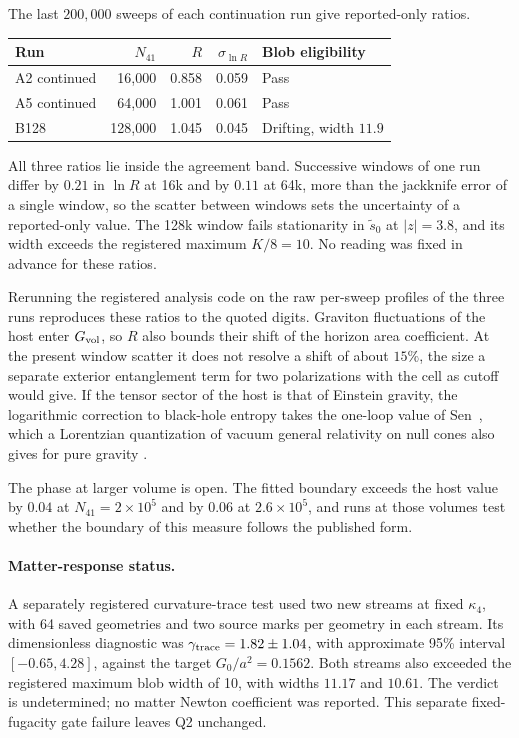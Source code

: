 The last $200{,}000$ sweeps of each continuation run give reported-only
ratios.

\begin{center}
\small
\begin{tabular}{lrrrl}
\hline
Run & $N_{41}$ & $R$ & $\sigma_{\ln R}$ & Blob eligibility\\
\hline
A2 continued & 16,000 & 0.858 & 0.059 & Pass\\
A5 continued & 64,000 & 1.001 & 0.061 & Pass\\
B128 & 128,000 & 1.045 & 0.045 & Drifting, width $11.9$\\
\hline
\end{tabular}
\end{center}

All three ratios lie inside the agreement band. Successive windows of one
run differ by $0.21$ in $\ln R$ at 16k and by $0.11$ at 64k, more than the
jackknife error of a single window, so the scatter between windows sets
the uncertainty of a reported-only value. The 128k window fails
stationarity in $\widetilde s_0$ at $|z|=3.8$, and its width exceeds the
registered maximum $K/8=10$. No reading was fixed in advance for these
ratios.

Rerunning the registered analysis code on the raw per-sweep profiles of
the three runs reproduces these ratios to the quoted digits. Graviton
fluctuations of the host enter $G_{\rm vol}$, so $R$ also bounds their
shift of the horizon area coefficient. At the present window scatter it
does not resolve a shift of about $15\%$, the size a separate exterior
entanglement term for two polarizations with the cell as cutoff would
give. If the tensor sector of the host is that of Einstein gravity, the
logarithmic correction to black-hole entropy takes the one-loop value
of Sen~\cite{sen2013}, which a Lorentzian quantization of vacuum general
relativity on null cones also gives for pure gravity
\cite{chandrasekaran2026}.

The phase at larger volume is open. The fitted boundary exceeds the host
value by $0.04$ at $N_{41}=2\times10^5$ and by $0.06$ at $2.6\times10^5$,
and runs at those volumes test whether the boundary of this measure
follows the published form.

\paragraph{Matter-response status.}
A separately registered curvature-trace test used two new streams at
fixed $\kappa_4$, with 64 saved geometries and two source marks per
geometry in each stream. Its dimensionless diagnostic was
$\gamma_{\rm trace}=1.82\pm1.04$, with approximate 95\% interval
$[-0.65,4.28]$, against the target $G_0/a^2=0.1562$.
Both streams also exceeded the registered maximum blob width of 10,
with widths $11.17$ and $10.61$. The verdict is
\textsf{undetermined}; no matter Newton coefficient was reported.
This separate fixed-fugacity gate failure leaves Q2 unchanged.


